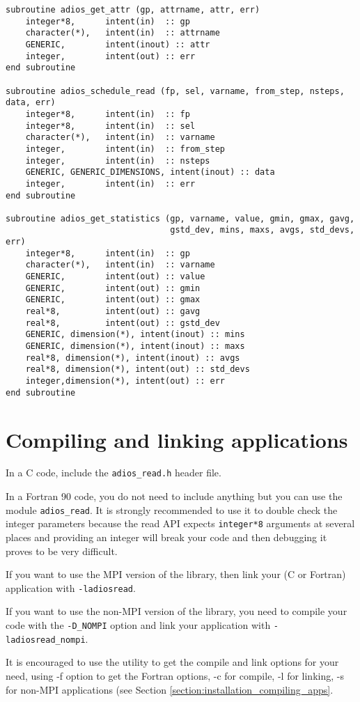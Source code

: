 \begin{lstlisting}[language=ADIOS,alsolanguage=Fortran]
subroutine adios_get_attr (gp, attrname, attr, err)
    integer*8,      intent(in)  :: gp
    character(*),   intent(in)  :: attrname
    GENERIC,        intent(inout) :: attr
    integer,        intent(out) :: err
end subroutine

subroutine adios_schedule_read (fp, sel, varname, from_step, nsteps, data, err)
    integer*8,      intent(in)  :: fp
    integer*8,      intent(in)  :: sel
    character(*),   intent(in)  :: varname
    integer,        intent(in)  :: from_step
    integer,        intent(in)  :: nsteps
    GENERIC, GENERIC_DIMENSIONS, intent(inout) :: data
    integer,        intent(in)  :: err
end subroutine

subroutine adios_get_statistics (gp, varname, value, gmin, gmax, gavg, 
                                 gstd_dev, mins, maxs, avgs, std_devs, err)
    integer*8,      intent(in)  :: gp
    character(*),   intent(in)  :: varname
    GENERIC,        intent(out) :: value
    GENERIC,        intent(out) :: gmin
    GENERIC,        intent(out) :: gmax
    real*8,         intent(out) :: gavg
    real*8,         intent(out) :: gstd_dev
    GENERIC, dimension(*), intent(inout) :: mins
    GENERIC, dimension(*), intent(inout) :: maxs
    real*8, dimension(*), intent(inout) :: avgs
    real*8, dimension(*), intent(out) :: std_devs
    integer,dimension(*), intent(out) :: err
end subroutine
\end{lstlisting}

\section{Compiling and linking applications}

In a C code, include the \verb+adios_read.h+ header file. 

In a Fortran 90 code, you do not need to include anything but you can use the module 
\verb+adios_read+. It is strongly recommended to use it to double check the integer 
parameters because the read API expects \verb+integer*8+ arguments 
at several places and providing an integer will break your code and then debugging 
it proves to be very difficult.

If you want to use the MPI version of the library, then link your (C or Fortran) 
application with \verb+-ladiosread+.

If you want to use the non-MPI version of the library, you need to compile your 
code with the \verb+-D_NOMPI+ option and link your application with \verb+-ladiosread_nompi+.

It is encouraged to use the utility to get the compile and link options for your 
need, using -f option to get the Fortran options, -c for compile, -l for linking, 
-s for non-MPI applications (see Section \ref{section:installation_compiling_apps}. 
